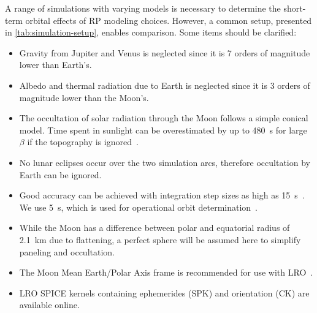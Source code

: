 A range of simulations with varying models is necessary to determine the short-term orbital effects of \gls{RP} modeling choices. However, a common setup, presented in \cref{tab:simulation-setup}, enables comparison. Some items should be clarified:
\begin{itemize}
    \item Gravity from Jupiter and Venus is neglected since it is 7 orders of magnitude lower than Earth's.
    \item Albedo and thermal radiation due to Earth is neglected since it is 3 orders of magnitude lower than the Moon's.
    \item The occultation of solar radiation through the Moon follows a simple conical model. Time spent in sunlight can be overestimated by up to \qty{480}{\s} for large $\beta$ if the topography is ignored~\cite{Mazarico2018}.
    \item No lunar eclipses occur over the two simulation arcs, therefore occultation by Earth can be ignored.
    \item Good accuracy can be achieved with integration step sizes as high as \qty{15}{\s}~\cite{Mazarico2018}. We use \qty{5}{\s}, which is used for operational orbit determination~\cite{Nicholson2010}.
    \item While the Moon has a difference between polar and equatorial radius of \qty{2.1}{\km} due to flattening, a perfect sphere will be assumed here to simplify paneling and occultation.
    \item The Moon Mean Earth/Polar Axis frame is recommended for use with \gls{LRO}~\cite{GSFC2008}.
    \item \gls{LRO} SPICE kernels containing ephemerides (SPK) and orientation (CK) are available online.
\end{itemize}
